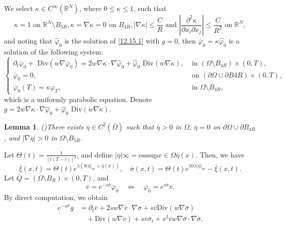 \documentclass[11pt]{article}
\newtheorem{lemma}{Lemma}[section]
\numberwithin{equation}{section}
\begin{document}
We select $\kappa \in C^\infty(\mathbb{R}^N)$, where $0 \leq \kappa \leq 1$, such that
\begin{equation*}
	\kappa = 1 \text{  on } \mathbb{R}^N \setminus B_{5R},   \kappa = \nabla \kappa = 0 \text{  on } B_{4R},   |\nabla \kappa| \leq \frac{C}{R} \text{  and } \left|\frac{\partial^2 \kappa}{\partial x_i \partial x_j}\right| \leq \frac{C}{R^2} \text{  on } \mathbb{R}^N,
\end{equation*}
and noting that $\widehat{\varphi}_0$ is the solution of \eqref{12.15.1} with $g=0$, then $\overline{\varphi}_0 = \kappa \widehat{\varphi}_0$ is a solution of the following system:
\begin{equation}\label{12.24.1}
	\begin{cases}
		\partial_t \overline{\varphi}_0 + \text{ Div}(w \nabla \overline{\varphi}_0) = 2w \nabla \kappa \cdot \nabla \widehat{\varphi}_0 + \widehat{\varphi}_0 \text{ Div}(w \nabla \kappa), &\text{ in } (\Omega \setminus B_{4R}) \times (0,T),\\
		\overline{\varphi}_0 = 0, &\text{ on } (\partial \Omega \cup \partial B{4R}) \times (0,T),\\
		\overline{\varphi}_0(T) = \kappa \varphi_T, &\text{ in } \Omega \setminus B_{4R},
	\end{cases}
\end{equation}
which is a uniformly parabolic equation. Denote $g = 2w \nabla \kappa \cdot \nabla \widehat{\varphi}_0 + \widehat{\varphi}_0 \text{ Div}(w \nabla \kappa)$.
\begin{lemma}(\cite[lemma 1.2]{FG})\label{12.23.L2}
	There exists $\overline{\eta} \in C^2(\overline{\Omega})$ such that $\overline{\eta} > 0$ in $\Omega$, $\overline{\eta} = 0$ on $\partial \Omega \cup \partial B_{4R}$, and $|\nabla \overline{\eta}| > 0$ in $\overline{\Omega \setminus B_{5R}}$.
\end{lemma}
Let $\Theta(t) = \frac{1}{[t(T-t)]^4}$, and define $|\overline{\eta}|\infty = \text{esssup}{x \in \Omega} \overline{\eta}(x)$. Then, we have
$$
\overline{\xi}(x,t) = \Theta(t) e^{\lambda(8|\overline{\eta}|_\infty + \overline{\eta}(x))}, \quad \overline{\sigma}(x,t) = \Theta(t) e^{10\lambda|\overline{\eta}|_\infty} - \overline{\xi}(x,t).
$$
Let $\overline{Q} = (\Omega \setminus B_R) \times (0,T)$, and
$$
\overline{v} = e^{-s\overline{\sigma}} \overline{\varphi}_0 \quad \iff \quad \overline{\varphi}_0 = e^{s\overline{\sigma}} \overline{v}.
$$
By direct computation, we obtain
$$
\begin{aligned}
	e^{-s\overline{\sigma}}g
	&= \partial_t \overline{v} + 2s w \nabla \overline{v} \cdot \nabla \overline{\sigma} + s \overline{v} \text{Div}(w \nabla \overline{\sigma}) \\
	&\quad + \text{Div}(w \nabla \overline{v}) + s \overline{v} \overline{\sigma}_t + s^2 \overline{v} w \nabla \overline{\sigma} \cdot \nabla \overline{\sigma}.
\end{aligned}
$$
\end{document}
